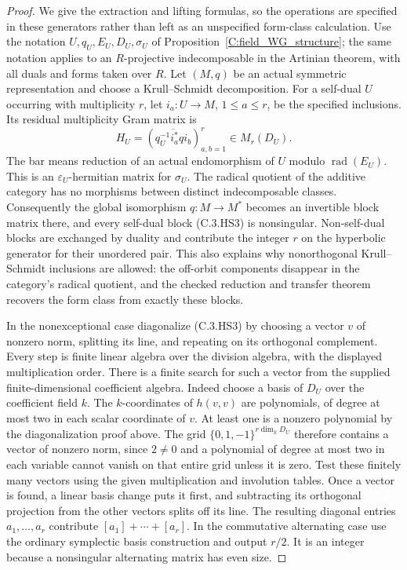 \begin{proof}
We give the extraction and lifting formulas, so the operations are
specified in these generators rather than left as an unspecified
form-class calculation. Use the notation $U,q_U,E_U,D_U,\sigma_U$
of Proposition~\ref{C:field_WG_structure}; the same notation applies
to an $R$-projective indecomposable in the Artinian theorem, with
all duals and forms taken over $R$.
Let $(M,q)$ be an actual symmetric representation and choose a
Krull--Schmidt decomposition. For a self-dual $U$ occurring with
multiplicity $r$, let $i_a:U\to M$, $1\leq a\leq r$, be the
specified inclusions. Its residual multiplicity Gram matrix is
\[
 H_U=\left(\overline{q_U^{-1}i_a^*q i_b}\right)_{a,b=1}^r
                  \in M_r(D_U).                         \tag{C.3.HS3}
\]
The bar means reduction of an actual endomorphism of $U$ modulo
$\operatorname{rad}(E_U)$. This is an
$\varepsilon_U$-hermitian matrix for $\sigma_U$.
The radical quotient of the additive category has no morphisms
between distinct indecomposable classes. Consequently the global
isomorphism $q:M\to M^*$ becomes an invertible block matrix there,
and every self-dual block (C.3.HS3) is nonsingular. Non-self-dual
blocks are exchanged by duality and contribute the integer $r$
on the hyperbolic generator for their unordered pair. This also
explains why nonorthogonal Krull--Schmidt inclusions are allowed:
the off-orbit components disappear in the category's radical
quotient, and the checked reduction and transfer theorem recovers
the form class from exactly these blocks.

In the nonexceptional case diagonalize (C.3.HS3) by choosing a
vector $v$ of nonzero norm, splitting its line, and repeating on
its orthogonal complement. Every step is finite linear algebra
over the division algebra, with the displayed multiplication order.
There is a finite search for such a vector from the supplied
finite-dimensional coefficient algebra. Indeed choose a basis of
$D_U$ over the coefficient field $k$. The $k$-coordinates of
$h(v,v)$ are polynomials, of degree at most two in each scalar
coordinate of $v$. At least one is a nonzero polynomial by the
diagonalization proof above. The grid
$\{0,1,-1\}^{r\dim_kD_U}$ therefore contains a vector of nonzero
norm, since $2\ne0$ and a polynomial of degree at most two in each
variable cannot vanish on that entire grid unless it is zero.
Test these finitely many vectors using the given multiplication
and involution tables. Once a vector is found, a linear basis change
puts it first, and subtracting its orthogonal projection from the
other vectors splits off its line. The resulting diagonal entries
$a_1,\ldots,a_r$ contribute
$[a_1]+\cdots+[a_r]$.
In the commutative alternating case use the ordinary symplectic
basis construction and output $r/2$. It is an integer because a
nonsingular alternating matrix has even size.


\end{proof}
